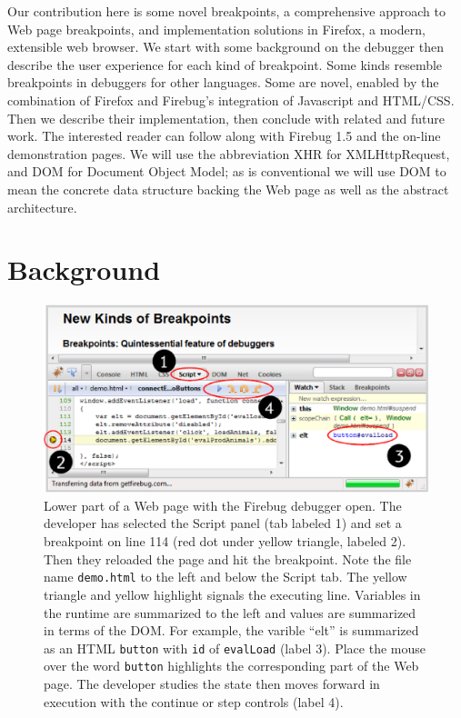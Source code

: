 \documentclass{www2010-accepted}
\begin{document}
Our contribution here is some novel breakpoints,
a comprehensive approach to Web page breakpoints, and implementation
solutions in Firefox, a modern, extensible web browser.
We start with some background on the debugger then describe the
user experience for each kind of breakpoint. Some kinds resemble
breakpoints in debuggers for other languages. Some are novel, enabled by
the combination of Firefox and Firebug's integration of Javascript and HTML/CSS.
Then we describe their implementation, then conclude with related and future work.
The interested reader can follow along with Firebug 1.5
and the on-line demonstration pages\cite{breakpointsDemoPage}.
We will use the
abbreviation XHR for XMLHttpRequest, and DOM for Document Object
Model; as is conventional we will use DOM to mean the concrete data
structure backing the Web page as well as the abstract architecture.

\section{Background}
\begin{figure}[htp]
\center
\includegraphics[scale=0.7]{FirebugOnBreakpoint.eps}
\caption{Lower part of a Web page with the Firebug debugger open. The
developer has selected the Script panel (tab labeled 1) and set a
breakpoint on line 114 (red dot under yellow triangle, labeled
2). Then they reloaded the page and hit the breakpoint. Note the file
name \texttt{demo.html} to the left and below the Script tab.  The yellow
triangle and yellow highlight signals the executing line. Variables in
the runtime are summarized to the left and values are summarized in
terms of the DOM. For example, the varible ``elt'' is summarized as an
HTML \texttt{button} with \texttt{id} of \texttt{evalLoad} (label
3). Place the mouse over the word \texttt{button} highlights the corresponding part of the Web page.
The developer studies the state then moves forward in execution
with the continue or step controls (label 4). }
\label{fig:firebug}
\end{figure}
\end{document}
